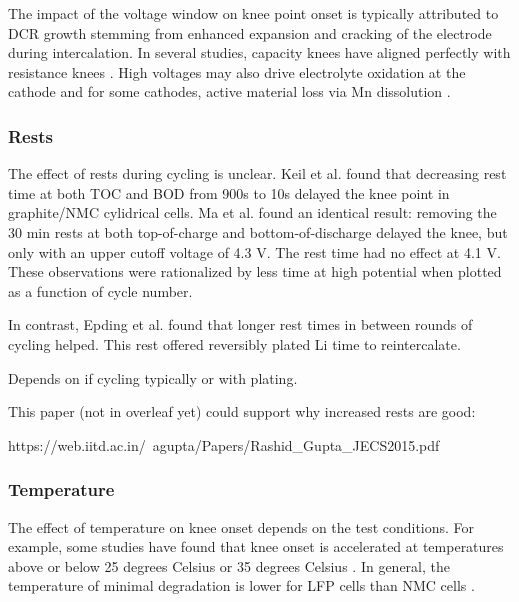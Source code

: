 \documentclass{article}
\begin{document}
The impact of the voltage window on knee point onset is typically attributed to DCR growth stemming from enhanced expansion and cracking of the electrode during intercalation. In several studies, capacity knees have aligned perfectly with resistance knees \cite{ecker_calendar_2014, klett_non-uniform_2014, schuster_nonlinear_2015, zhu_investigation_2021}. High voltages may also drive electrolyte oxidation at the cathode \cite{aiken_accelerated_2020} and for some cathodes, active material loss via Mn dissolution \cite{ma_novel_2019}. 



\subsubsection{Rests}

The effect of rests during cycling is unclear. 
Keil et al.\cite{keil_linear_2019} found that decreasing rest time at both TOC and BOD from 900s to 10s delayed the knee point in graphite/NMC cylidrical cells.
Ma et al.\cite{ma_editors_2019} found an identical result: removing the 30 min rests at both top-of-charge and bottom-of-discharge delayed the knee, but only with an upper cutoff voltage of 4.3 V. The rest time had no effect at 4.1 V.
These observations were rationalized by less time at high potential when plotted as a function of cycle number.

In contrast, Epding et al.\cite{epding_investigation_2019} found that longer rest times in between rounds of cycling helped. This rest offered reversibly plated Li time to reintercalate.

Depends on if cycling typically or with plating.

This paper (not in overleaf yet) could support why increased rests are good:

https://web.iitd.ac.in/~agupta/Papers/Rashid_Gupta_JECS2015.pdf 

\subsubsection{Temperature}
The effect of temperature on knee onset depends on the test conditions. For example, some studies have found that knee onset is accelerated at temperatures above or below 25 degrees Celsius \cite{zhang_accelerated_2019, waldmann_temperature_2014, waldmann_optimization_2015} or 35 degrees Celsius \cite{schuster_nonlinear_2015}. In general, the temperature of minimal degradation is lower for LFP cells than NMC cells \cite{SNL long-term cycling paper}. 
\end{document}
